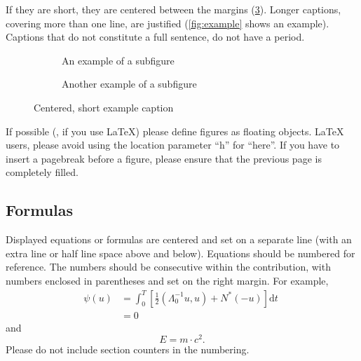 \documentclass[runningheads]{eccv/llncs}
\begin{document}
If they are short, they are centered between the margins (\cf \cref{fig:short}). 
Longer captions, covering more than one line, are justified (\cref{fig:example} shows an example). 
Captions that do not constitute a full sentence, do not have a period.



\begin{figure}[tb]
  \centering
  \begin{subfigure}{0.68\linewidth}
    \fbox{\rule{0pt}{0.5in} \rule{.9\linewidth}{0pt}}
    \caption{An example of a subfigure}
    \label{fig:short-a}
  \end{subfigure}
  \hfill
  \begin{subfigure}{0.28\linewidth}
    \fbox{\rule{0pt}{0.5in} \rule{.9\linewidth}{0pt}}
    \caption{Another example of a subfigure}
    \label{fig:short-b}
  \end{subfigure}
  \caption{Centered, short example caption}
  \label{fig:short}
\end{figure}

If possible (\eg, if you use \LaTeX) please define figures as floating objects. 
\LaTeX{} users, please avoid using the location parameter ``h'' for ``here''. 
If you have to insert a pagebreak before a figure, please ensure that the previous page is completely filled.


\subsection{Formulas}
Displayed equations or formulas are centered and set on a separate line (with an extra line or half line space above and below). 
Equations should be numbered for reference. 
The numbers should be consecutive within the contribution, with numbers enclosed in parentheses and set on the right margin.
For example,
\begin{align}
  \psi (u) & = \int_{0}^{T} \left[\frac{1}{2}
  \left(\Lambda_{0}^{-1} u,u\right) + N^{\ast} (-u)\right] \text{d}t \; \\
& = 0
\end{align}
and 
\begin{equation}
  E = m\cdot c^2.
  \label{eq:important}
\end{equation}
Please do not include section counters in the numbering.
\end{document}
